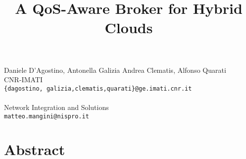 \title{A QoS-Aware Broker for Hybrid Clouds}
 \author{} \institute{}
\maketitle
\begin{center}
{\large Daniele D'Agostino, Antonella Galizia Andrea Clematis, Alfonso Quarati}\\
CNR-IMATI\\
{\tt \{dagostino, galizia,clematis,quarati\}@ge.imati.cnr.it}
\\ \vspace{4mm}{\large Matteo Mangini}\\
Network Integration and Solutions\\
{\tt matteo.mangini@nispro.it}

\end{center}

\section*{Abstract}

